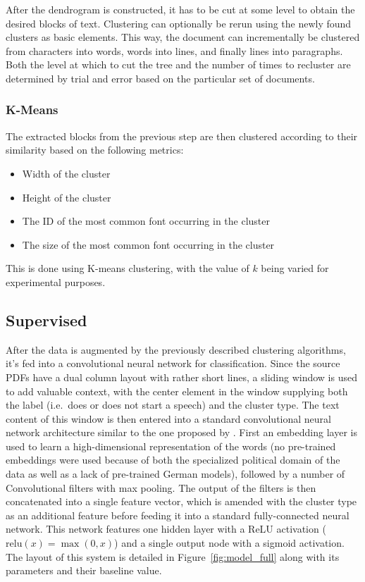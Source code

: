After the dendrogram is constructed, it has to be cut at some level to obtain
the desired blocks of text. Clustering can optionally be rerun using the newly
found clusters as basic elements. This way, the document can incrementally be
clustered from characters into words, words into lines, and finally lines into
paragraphs. Both the level at which to cut the tree and the number of times to
recluster are determined by trial and error based on the particular set of
documents.

\subsubsection{K-Means}
The extracted blocks from the previous step are then clustered according to
their similarity based on the following metrics:
\begin{itemize}
  \item Width of the cluster
  \item Height of the cluster
  \item The ID of the most common font occurring in the cluster
  \item The size of the most common font occurring in the cluster
\end{itemize}
This is done using K-means clustering, with the value of $k$ being varied for
experimental purposes.

\subsection{Supervised}%
\label{sec:sup}
After the data is augmented by the previously described clustering algorithms,
it's fed into a convolutional neural network for classification. Since the
source PDFs have a dual column layout with rather short lines, a sliding window
is used to add valuable context, with the center element in the window supplying
both the label (i.e.\ does or does not start a speech) and the cluster type. The
text content of this window is then entered into a standard convolutional neural
network architecture similar to the one proposed by \textcite{kim2014conv}.
First an embedding layer is used to learn a high-dimensional representation of
the words (no pre-trained embeddings were used because of both the specialized
political domain of the data as well as a lack of pre-trained German models),
followed by a number of Convolutional filters with max pooling. The output of
the filters is then concatenated into a single feature vector, which is amended
with the cluster type as an additional feature before feeding it into a standard
fully-connected neural network. This network features one hidden layer with a
ReLU activation ($\mathrm{relu}(x) = \max(0, x)$) and a single output node with
a sigmoid activation. The layout of this system is detailed in
Figure~\ref{fig:model_full}
along with its parameters and their baseline value.

